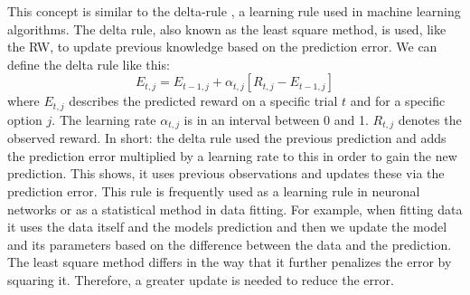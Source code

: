 
This concept is similar to the delta-rule \citep{widrow1960adaptive, gluck1988conditioning, yechiam2005comparison}, a learning rule used in machine learning algorithms. The delta rule, also known as the least square method, is used, like the RW, to update previous knowledge based on the prediction error. 
We can define the delta rule like this: 
\begin{equation}
    E_{t,j}= E_{t-1,j} + \alpha_{t,j}[R_{t,j}-E_{t-1,j}]
\end{equation}
where $E_{t,j}$ describes the predicted reward on a specific trial $t$ and for a specific option $j$. The learning rate $\alpha_{t,j}$ is in an interval between 0 and 1. $R_{t,j}$ denotes the observed reward. In short: the delta rule used the previous prediction and adds the prediction error multiplied by a learning rate to this in order to gain the new prediction. This shows, it uses previous observations and updates these via the prediction error. 
This rule is frequently used as a learning rule in neuronal networks or as a statistical method in data fitting. For example, when fitting data it uses the data itself and the models prediction and then we update the model and its parameters based on the difference between the data and the prediction. The least square method differs in the way that it further penalizes the error by squaring it. Therefore, a greater update is needed to reduce the error. 

